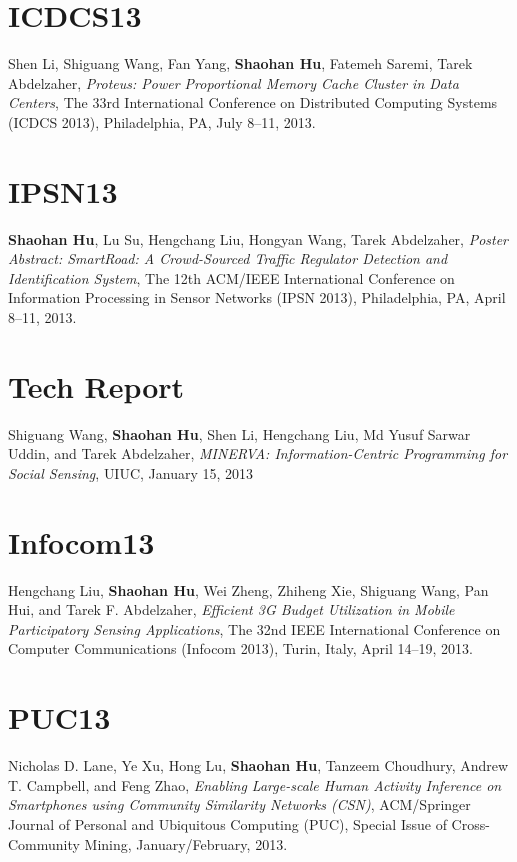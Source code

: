 \section{\sc ICDCS13}
Shen Li, Shiguang Wang, Fan Yang, \textbf{Shaohan Hu}, Fatemeh Saremi,
Tarek Abdelzaher, \emph{Proteus: Power Proportional Memory Cache
  Cluster in Data Centers}, \textsf{The 33rd International Conference
  on Distributed Computing Systems (ICDCS 2013)}, Philadelphia, PA,
July 8--11, 2013.

\section{\sc IPSN13}
\textbf{Shaohan Hu}, Lu Su, Hengchang Liu, Hongyan Wang, Tarek
Abdelzaher, \emph{Poster Abstract: SmartRoad: A Crowd-Sourced Traffic
  Regulator Detection and Identification System}, \textsf{The 12th
  ACM/IEEE International Conference on Information Processing in
  Sensor Networks (IPSN 2013)}, Philadelphia, PA, April 8--11, 2013.

\section{\sc Tech Report}
Shiguang Wang, \textbf{Shaohan Hu}, Shen Li, Hengchang Liu, Md Yusuf
Sarwar Uddin, and Tarek Abdelzaher, \emph{MINERVA: Information-Centric
  Programming for Social Sensing}, \textsf{UIUC}, January 15, 2013

\section{\sc Infocom13}
Hengchang Liu, \textbf{Shaohan Hu}, Wei Zheng, Zhiheng Xie, Shiguang
Wang, Pan Hui, and Tarek F. Abdelzaher, \emph{Efficient 3G Budget
  Utilization in Mobile Participatory Sensing Applications},
\textsf{The 32nd IEEE International Conference on Computer
  Communications (Infocom 2013)}, Turin, Italy, April 14--19, 2013.

\section{\sc PUC13}
Nicholas D. Lane, Ye Xu, Hong Lu, \textbf{Shaohan Hu}, Tanzeem
Choudhury, Andrew T. Campbell, and Feng Zhao, \emph{Enabling
  Large-scale Human Activity Inference on Smartphones using Community
  Similarity Networks (CSN)}, \textsf{ACM/Springer Journal of Personal
  and Ubiquitous Computing (PUC), Special Issue of Cross-Community
  Mining}, January/February, 2013.

